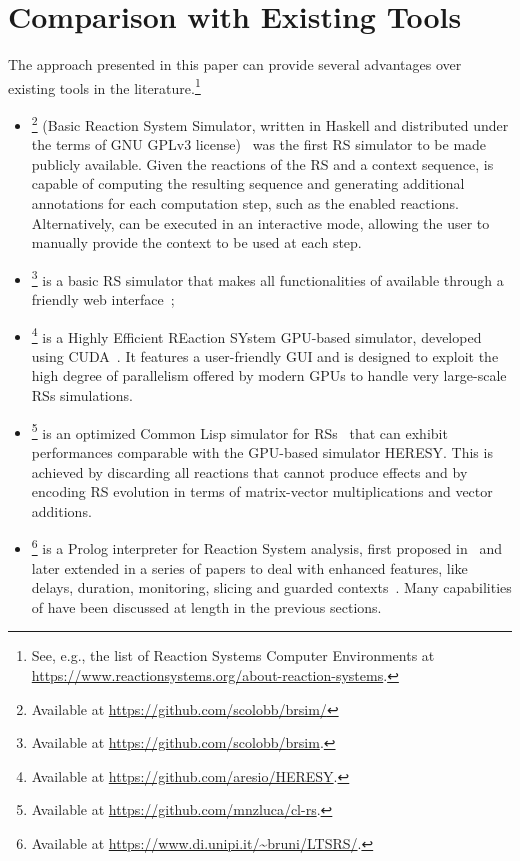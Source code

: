 
\section{Comparison with Existing Tools}\label{sec:related}

The approach presented in this paper can provide several advantages over existing tools in the literature.\footnote{See, e.g., the list of Reaction Systems Computer Environments at \url{https://www.reactionsystems.org/about-reaction-systems}.}
\begin{itemize}
\item
\brsim\footnote{Available at \url{https://github.com/scolobb/brsim/}} (Basic Reaction System Simulator, written in Haskell and distributed under the terms of GNU GPLv3 license)~\cite{DBLP:journals/tcs/AzimiGIP15} was the first RS simulator to be made publicly available. 
Given the reactions of the RS and a context sequence, \brsim is capable of computing the resulting sequence and generating additional annotations for each computation step, such as the enabled reactions.
Alternatively, \brsim can be executed in an interactive mode, allowing the user to manually provide the context to be used at each step.
\item
\WebRSim\footnote{Available at \url{https://github.com/scolobb/brsim}.} is a basic RS simulator that makes all functionalities of  \brsim available through a friendly web interface~\cite{DBLP:conf/birthday/0001RAP18};
\item 
\HERESY\footnote{Available at \url{https://github.com/aresio/HERESY}.} is a Highly Efficient REaction SYstem GPU-based simulator, developed using CUDA~\cite{DBLP:journals/fuin/NobilePSMCMB17}. It features a user-friendly GUI and is designed to exploit the high degree of parallelism offered by modern GPUs to handle very large-scale RSs simulations.
\item
\clrs\footnote{Available at \url{https://github.com/mnzluca/cl-rs}.} is an optimized Common Lisp simulator for RSs~\cite{DBLP:journals/fuin/FerrettiLMP20} that can exhibit performances comparable with the GPU-based simulator \textsf{HERESY}. This is achieved by discarding all reactions that cannot produce effects and by encoding RS evolution in terms of matrix-vector multiplications and vector additions.
\item 
\BioResolve\footnote{Available at \url{https://www.di.unipi.it/~bruni/LTSRS/}.} is a Prolog interpreter for Reaction System analysis, first proposed in~\cite{DBLP:journals/tcs/BrodoBF21} and later extended in a series of papers to deal with enhanced features, like delays, duration, monitoring, slicing and guarded contexts~\cite{DBLP:journals/nca/BrodoBFGLM23,DBLP:journals/nc/BrodoBF24,DBLP:conf/cmsb/BowlesBBFGM24}. Many capabilities of \BioResolve have been discussed at length in the previous sections.

\end{itemize}
